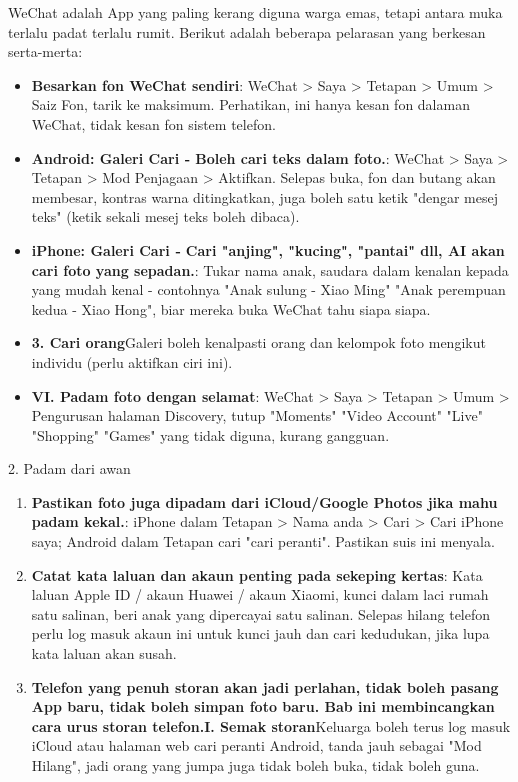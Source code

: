 
WeChat adalah App yang paling kerang diguna warga emas, tetapi antara muka terlalu padat terlalu rumit. Berikut adalah beberapa pelarasan yang berkesan serta-merta:

\begin{itemize}
  \item \textbf{Besarkan fon WeChat sendiri}: WeChat > Saya > Tetapan > Umum > Saiz Fon, tarik ke maksimum. Perhatikan, ini hanya kesan fon dalaman WeChat, tidak kesan fon sistem telefon.
  \item \textbf{Android: Galeri Cari ‑ Boleh cari teks dalam foto.}: WeChat > Saya > Tetapan > Mod Penjagaan > Aktifkan. Selepas buka, fon dan butang akan membesar, kontras warna ditingkatkan, juga boleh satu ketik "dengar mesej teks" (ketik sekali mesej teks boleh dibaca).
  \item \textbf{iPhone: Galeri Cari ‑ Cari "anjing", "kucing", "pantai" dll, AI akan cari foto yang sepadan.}: Tukar nama anak, saudara dalam kenalan kepada yang mudah kenal - contohnya "Anak sulung - Xiao Ming" "Anak perempuan kedua - Xiao Hong", biar mereka buka WeChat tahu siapa siapa.
  \item \textbf{3. Cari orang}Galeri boleh kenalpasti orang dan kelompok foto mengikut individu (perlu aktifkan ciri ini).
  \item \textbf{VI. Padam foto dengan selamat}: WeChat > Saya > Tetapan > Umum > Pengurusan halaman Discovery, tutup "Moments" "Video Account" "Live" "Shopping" "Games" yang tidak diguna, kurang gangguan.
\end{itemize}


2. Padam dari awan

\begin{enumerate}
  \item \textbf{Pastikan foto juga dipadam dari iCloud/Google Photos jika mahu padam kekal.}: iPhone dalam Tetapan > Nama anda > Cari > Cari iPhone saya; Android dalam Tetapan cari "cari peranti". Pastikan suis ini menyala.
  \item \textbf{Catat kata laluan dan akaun penting pada sekeping kertas}: Kata laluan Apple ID / akaun Huawei / akaun Xiaomi, kunci dalam laci rumah satu salinan, beri anak yang dipercayai satu salinan. Selepas hilang telefon perlu log masuk akaun ini untuk kunci jauh dan cari kedudukan, jika lupa kata laluan akan susah.
  \item \textbf{Telefon yang penuh storan akan jadi perlahan, tidak boleh pasang App baru, tidak boleh simpan foto baru. Bab ini membincangkan cara urus storan telefon.}\textbf{I. Semak storan}Keluarga boleh terus log masuk iCloud atau halaman web cari peranti Android, tanda jauh sebagai "Mod Hilang", jadi orang yang jumpa juga tidak boleh buka, tidak boleh guna.
\end{enumerate}

